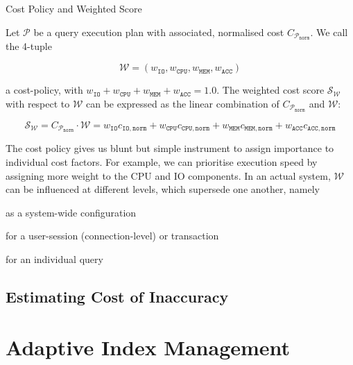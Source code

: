 \begin{definition}[label=definition:cost_policy]{Cost Policy and Weighted Score}{}

    Let $\mathcal{P}$  be a query execution plan with associated, normalised cost $C_{\mathcal{P}_{\mathtt{norm}}}$. We call the 4-tuple

    \begin{equation*}
        \mathcal{W} = (w_{\mathtt{IO}}, w_{\mathtt{CPU}}, w_{\mathtt{MEM}}, w_{\mathtt{ACC}})
    \end{equation*}

    a cost-policy, with $w_{\mathtt{IO}} + w_{\mathtt{CPU}} + w_{\mathtt{MEM}} + w_{\mathtt{ACC}} = 1.0$. The weighted cost score $\mathcal{S}_{\mathcal{W}}$ with respect to $\mathcal{W}$ can be expressed as the linear combination of $C_{\mathcal{P}_{\mathtt{norm}}}$ and $\mathcal{W}$:

    \begin{equation*}
        \mathcal{S}_{\mathcal{W}} = C_{\mathcal{P}_{\mathtt{norm}}} \cdot \mathcal{W} = w_{\mathtt{IO}}c_{\mathtt{IO},\mathtt{norm}} + w_{\mathtt{CPU}} c_{\mathtt{CPU},\mathtt{norm}} + w_{\mathtt{MEM}} c_{\mathtt{MEM},\mathtt{norm}} + w_{\mathtt{ACC}} c_{\mathtt{ACC},\mathtt{norm}}
    \end{equation*}
\end{definition}

The cost policy gives us blunt but simple instrument to assign importance to individual cost factors. For example, we can prioritise execution speed by assigning more weight to the CPU and IO components. In an actual system, $\mathcal{W}$ can be influenced at different levels, which supersede one another, namely 
\begin{enumerate*}[label=(\roman*), itemjoin={{, }}, itemjoin*={{, or, }}, after={{.}}]
    \item as a system-wide configuration
    \item for a user-session (connection-level) or transaction
    \item for an individual query
\end{enumerate*}

\subsection{Estimating Cost of Inaccuracy}
\label{section:inaccuracy_cost_estimation}



\section{Adaptive Index Management}

